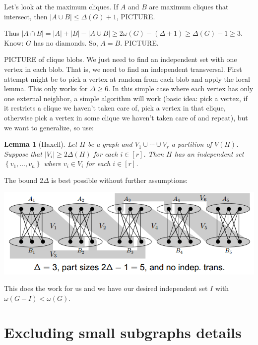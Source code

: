 \documentclass[12pt]{article}
\theoremstyle{plain}
\newtheorem{lem}[thm]{Lemma}
\theoremstyle{definition}
\theoremstyle{remark}
\newcommand{\set}[1]{\left\{ #1 \right\}}
\newcommand{\card}[1]{\left|#1\right|}
\newcommand{\irange}[1]{\left[#1\right]}
\begin{document}
\bigskip

Let's look at the maximum cliques.  If $A$ and $B$ are maximum cliques that intersect, then $\card{A \cup B} \leq \Delta(G) + 1$, PICTURE. 

Thus $\card{A\cap B} = |A| + |B| - \card{A \cup B} \geq 2\omega(G) - (\Delta + 1) \geq \Delta(G) - 1 \geq 3$. Know: $G$ has no diamonds.  So, $A = B$. PICTURE.

\bigskip

PICTURE of clique blobs.  We just need to find an independent set with one vertex in each blob.  That is, we need to find an independent transversal.  First attempt might be to pick a vertex at random from each blob and apply the local lemma.  This only works for $\Delta \geq 6$.  In this simple case where each vertex has only one external neighbor, a simple algorithm will work (basic idea: pick a vertex, if it restricts a clique we haven't taken care of, pick a vertex in that clique, otherwise pick a vertex in some clique we haven't taken care of and repeat), but we want to generalize, so use:

\begin{lem}[Haxell]\label{HaxellLemma}
Let $H$ be a graph and $V_1 \cup \cdots \cup V_r$ a partition of $V(H)$. Suppose that $\card{V_i} \geq 2\Delta(H)$ for each $i \in \irange{r}$. Then $H$ has an independent set $\set{v_1, \ldots, v_n}$ where $v_i \in V_i$ for each $i \in \irange{r}$.
\end{lem}

The bound $2\Delta$ is best possible without further assumptions:

\begin{center}
\includegraphics{notransversal.PNG}
\end{center}

This does the work for us and we have our desired independent set $I$ with $\omega(G-I) < \omega(G)$.

\section{Excluding small subgraphs details}
\end{document}
